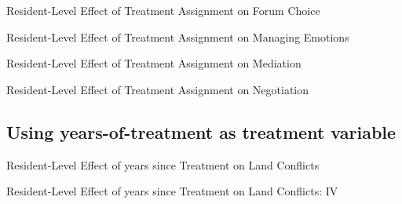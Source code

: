 \documentclass[10pt]{article}
\begin{document}
\begin{table}[H]
\caption{Resident-Level Effect of Treatment Assignment on Forum Choice}
\begin{center}

\end{center}
\end{table}


\begin{table}[H]
\caption{Resident-Level Effect of Treatment Assignment on Managing Emotions}
\begin{center}
\begin{adjustbox}{max width = \textwidth}

\end{adjustbox}
\end{center}
\end{table}

\begin{table}[H]
\caption{Resident-Level Effect of Treatment Assignment on Mediation}
\begin{center}
\begin{adjustbox}{max width = \textwidth}

\end{adjustbox}
\end{center}
\end{table}

\begin{table}[H]
\caption{Resident-Level Effect of Treatment Assignment on Negotiation}
\begin{center}
\begin{adjustbox}{max width = \textwidth}

\end{adjustbox}
\end{center}
\end{table}

\subsection{Using years-of-treatment as treatment variable}

\begin{landscape}
\begin{table}[H]
\caption{Resident-Level Effect of years since Treatment on Land Conflicts}
\begin{center}
\begin{adjustbox}{max height = .6\textheight}

\end{adjustbox}
\end{center}
\end{table}

\begin{table}[H]
\caption{Resident-Level Effect of years since Treatment on Land Conflicts: IV}
\begin{center}
\begin{adjustbox}{max width = \textwidth}

\end{adjustbox}
\end{center}
\end{table}
\end{landscape}
\end{document}
